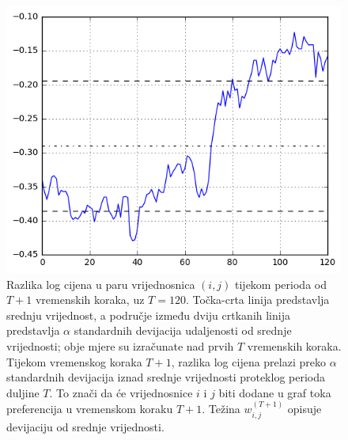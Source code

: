 \documentclass[lmodern, utf8, diplomski, numeric]{fer}
\begin{document}
  \begin{figure}[htb]
    \centering
    \includegraphics[width=0.9\columnwidth]{graphics/deviation-magnitude.png}
    \caption{
       Razlika log cijena u paru vrijednosnica $(i,j)$ tijekom perioda od $T + 1$ vremenskih koraka, uz $T = 120$.
       Točka-crta linija predstavlja srednju vrijednost, a područje između dviju crtkanih linija predstavlja $\alpha$ standardnih devijacija udaljenosti od srednje vrijednosti; obje mjere su izračunate nad prvih $T$ vremenskih koraka.
       Tijekom vremenskog koraka $T + 1$, razlika log cijena prelazi preko $\alpha$ standardnih devijacija iznad srednje vrijednosti proteklog perioda duljine $T$.
       To znači da će vrijednosnice $i$ i $j$ biti dodane u graf toka preferencija u vremenskom koraku $T + 1$.
       Težina $w_{i,j}^{(T+1)}$ opisuje devijaciju od srednje vrijednosti.
    }
    \label{fig:devmag}
  \end{figure}
  
\end{document}
